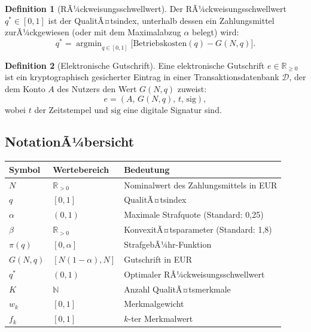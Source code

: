 ﻿\documentclass[a4paper,12pt]{article}
\theoremstyle{definition}
\newtheorem{definition}{Definition}
\begin{document}
\begin{definition}[RÃ¼ckweisungsschwellwert]
\label{def:schwellwert}
Der RÃ¼ckweisungsschwellwert $q^* \in [0,1]$ ist der QualitÃ¤tsindex, unterhalb
dessen ein Zahlungsmittel zurÃ¼ckgewiesen (oder mit dem Maximalabzug $\alpha$
belegt) wird:
\[
q^* = \operatorname{argmin}_{q \in [0,1]} \bigl[ \text{Betriebskosten}(q) - G(N,q) \bigr].
\]
\end{definition}

\begin{definition}[Elektronische Gutschrift]
\label{def:egutt}
Eine elektronische Gutschrift $e \in \mathbb{R}_{\geq 0}$ ist ein kryptographisch
gesicherter Eintrag in einer Transaktionsdatenbank $\mathcal{D}$, der dem Konto
$A$ des Nutzers den Wert $G(N,q)$ zuweist:
\[
e = (A,\, G(N,q),\, t,\, \text{sig}),
\]
wobei $t$ der Zeitstempel und $\text{sig}$ eine digitale Signatur sind.
\end{definition}

\subsection{NotationÃ¼bersicht}

\begin{center}
\begin{tabular}{llp{7cm}}
\toprule
Symbol & Wertebereich & Bedeutung \\
\midrule
$N$ & $\mathbb{R}_{>0}$ & Nominalwert des Zahlungsmittels in EUR \\
$q$ & $[0,1]$ & QualitÃ¤tsindex \\
$\alpha$ & $(0,1)$ & Maximale Strafquote (Standard: 0,25) \\
$\beta$ & $\mathbb{R}_{>0}$ & KonvexitÃ¤tsparameter (Standard: 1,8) \\
$\pi(q)$ & $[0,\alpha]$ & StrafgebÃ¼hr-Funktion \\
$G(N,q)$ & $[N(1-\alpha), N]$ & Gutschrift in EUR \\
$q^*$ & $(0,1)$ & Optimaler RÃ¼ckweisungsschwellwert \\
$K$ & $\mathbb{N}$ & Anzahl QualitÃ¤tsmerkmale \\
$w_k$ & $[0,1]$ & Merkmalgewicht \\
$f_k$ & $[0,1]$ & $k$-ter Merkmalwert \\
\bottomrule
\end{tabular}
\end{center}

\end{document}
